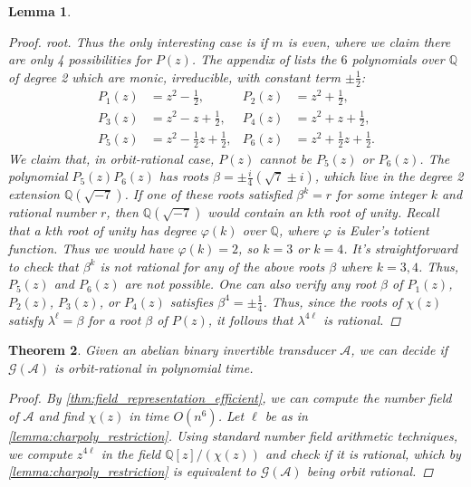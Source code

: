 \documentclass[12pt, letterpaper]{article}
\newcommand{\Q}{\mathbb Q}
\newcommand{\A}{\mathcal A}
\newcommand{\gp}{\mathcal G}
\newtheorem{thm}{Theorem}[section]
\newtheorem{lemma}[thm]{Lemma}
\begin{document}
\begin{lemma}
\begin{proof}
        root.  Thus the only interesting case is if $m$ is even, where we claim
        there are only 4 possibilities for $P(z)$. The appendix of
        \cite{Okano-Thesis} lists the $6$ polynomials over $\Q$ of degree 2
        which are monic, irreducible, with constant term $\pm \frac{1}{2}$:
        \begin{align*}
            P_1(z) &= z^2 - \frac{1}{2}, &
            P_2(z) &= z^2 + \frac{1}{2},\\
            P_3(z) &= z^2 - z + \frac{1}{2}, &
            P_4(z) &= z^2 + z + \frac{1}{2},\\
            P_5(z) &= z^2 - \frac{1}{2} z + \frac{1}{2}, &
            P_6(z) &= z^2 + \frac{1}{2} z + \frac{1}{2}.
        \end{align*}
        We claim that, in orbit-rational case, $P(z)$ cannot be $P_5(z)$ or
        $P_6(z)$.  The polynomial $P_5(z)P_6(z)$ has roots $\beta = \pm
        \frac{i}{4} (\sqrt{7} \pm i)$, which live in the degree 2 extension
        $\Q(\sqrt{-7})$. If one of these roots satisfied $\beta^k = r$ for some
        integer $k$ and rational number $r$, then $\Q(\sqrt{-7})$ would contain
        an $k$th root of unity. Recall that a $k$th root of unity has degree
        $\varphi(k)$ over $\Q$, where $\varphi$ is Euler's totient function.
        Thus we would have $\varphi(k) = 2$, so $k = 3$ or $k = 4$. It's
        straightforward to check that $\beta^k$ is not rational for any of the
        above roots $\beta$ where $k = 3,4$.  Thus, $P_5(z)$ and $P_6(z)$ are
        not possible. One can also verify any root $\beta$ of $P_1(z)$,
        $P_2(z)$, $P_3(z)$, or $P_4(z)$ satisfies $\beta^4 = \pm \frac{1}{4}$.
        Thus, since the roots of $\chi(z)$ satisfy $\lambda^\ell = \beta$ for a
        root $\beta$ of $P(z)$, it follows that $\lambda^{4\ell}$ is rational.
    \end{proof}
\end{lemma}

\begin{thm}\label{thm:orbit_algorithm}
    Given an abelian binary invertible transducer $\A$, we can decide if
    $\gp(\A)$ is orbit-rational in polynomial time.
    \begin{proof}
        By \cref{thm:field_representation_efficient}, we can compute the
        number field of $\A$ and find $\chi(z)$ in time $O(n^6)$.  Let $\ell$
        be as in \cref{lemma:charpoly_restriction}. Using standard number field
        arithmetic techniques, we compute $z^{4 \ell}$ in the field $\Q[z] /
        (\chi(z))$ and check if it is rational, which by
        \cref{lemma:charpoly_restriction} is equivalent to $\gp(\A)$ being
        orbit rational.
    \end{proof}
\end{thm}
\end{document}
